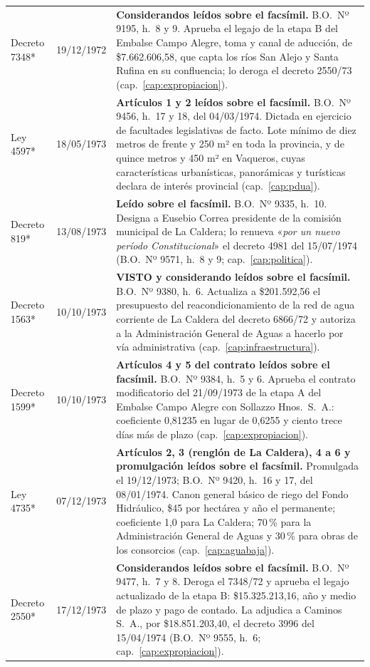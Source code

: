 \begin{longtable}{@{}p{3.2cm}p{1.9cm}p{7.9cm}@{}}
Decreto 7348* & 19/12/1972 & \textbf{Considerandos leídos sobre el facsímil.} B.O.\ Nº 9195, h.\ 8 y 9. Aprueba el legajo de la etapa B del Embalse Campo Alegre, toma y canal de aducción, de \$7.662.606,58, que capta los ríos San Alejo y Santa Rufina en su confluencia; lo deroga el decreto 2550/73 (cap.\ \ref{cap:expropiacion}). \\
Ley 4597* & 18/05/1973 & \textbf{Artículos 1 y 2 leídos sobre el facsímil.} B.O.\ Nº 9456, h.\ 17 y 18, del 04/03/1974. Dictada en ejercicio de facultades legislativas de facto. Lote mínimo de diez metros de frente y 250 m² en toda la provincia, y de quince metros y 450 m² en Vaqueros, cuyas características urbanísticas, panorámicas y turísticas declara de interés provincial (cap.\ \ref{cap:pdua}). \\
Decreto 819* & 13/08/1973 & \textbf{Leído sobre el facsímil.} B.O.\ Nº 9335, h.\ 10. Designa a Eusebio Correa presidente de la comisión municipal de La Caldera; lo renueva «\textit{por un nuevo período Constitucional}» el decreto 4981 del 15/07/1974 (B.O.\ Nº 9571, h.\ 8 y 9; cap.\ \ref{cap:politica}). \\
Decreto 1563* & 10/10/1973 & \textbf{VISTO y considerando leídos sobre el facsímil.} B.O.\ Nº 9380, h.\ 6. Actualiza a \$201.592,56 el presupuesto del reacondicionamiento de la red de agua corriente de La Caldera del decreto 6866/72 y autoriza a la Administración General de Aguas a hacerlo por vía administrativa (cap.\ \ref{cap:infraestructura}). \\
Decreto 1599* & 10/10/1973 & \textbf{Artículos 4 y 5 del contrato leídos sobre el facsímil.} B.O.\ Nº 9384, h.\ 5 y 6. Aprueba el contrato modificatorio del 21/09/1973 de la etapa A del Embalse Campo Alegre con Sollazzo Hnos.\ S.\ A.: coeficiente 0,81235 en lugar de 0,6255 y ciento trece días más de plazo (cap.\ \ref{cap:expropiacion}). \\
Ley 4735* & 07/12/1973 & \textbf{Artículos 2, 3 (renglón de La Caldera), 4 a 6 y promulgación leídos sobre el facsímil.} Promulgada el 19/12/1973; B.O.\ Nº 9420, h.\ 16 y 17, del 08/01/1974. Canon general básico de riego del Fondo Hidráulico, \$45 por hectárea y año el permanente; coeficiente 1,0 para La Caldera; 70\,\% para la Administración General de Aguas y 30\,\% para obras de los consorcios (cap.\ \ref{cap:aguabaja}). \\
Decreto 2550* & 17/12/1973 & \textbf{Considerandos leídos sobre el facsímil.} B.O.\ Nº 9477, h.\ 7 y 8. Deroga el 7348/72 y aprueba el legajo actualizado de la etapa B: \$15.325.213,16, año y medio de plazo y pago de contado. La adjudica a Caminos S.\ A., por \$18.851.203,40, el decreto 3996 del 15/04/1974 (B.O.\ Nº 9555, h.\ 6; cap.\ \ref{cap:expropiacion}). \\

\end{longtable}
